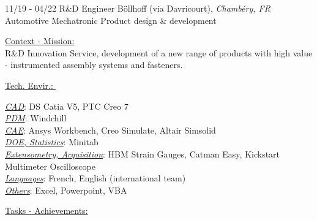 \documentclass[]{friggeri-cv}
\begin{document}
\begin{entrylist}
  \entry
    {11/19 - 04/22}
    {R\&D Engineer}
    {Böllhoff (via Davricourt), \textit{Chambéry, FR}}
    {Automotive Mechatronic Product design \& development}
\end{entrylist}
\vspace{-10pt}
\begin{minipage}[t]{0.65\linewidth}
\underline{Context - Mission: }\\
R\&D Innovation Service, development of a new range of products with high value - instrumented assembly systems and fasteners.\\
\end{minipage} %
\begin{minipage}[t]{0.38\textwidth}
    \underline{Tech. Envir.: }\
    \vspace{1mm}
    
\underline{\textit{CAD}}: DS Catia V5, PTC Creo 7\\
\underline{\textit{PDM}}: Windchill\\
\underline{\textit{CAE}}: Ansys Workbench, Creo Simulate, Altair Simsolid\\
\underline{\textit{DOE, Statistics}}: Minitab\\
\underline{\textit{Extensometry, Acquisition}}: HBM Strain Gauges, Catman Easy, Kickstart Multimeter Oscilloscope\\
\underline{\textit{Languages}}: French, English (international team)\\
\underline{\textit{Others}}: Excel, Powerpoint, VBA
    \end{minipage}
\vspace{1.5mm}
\underline{Tasks - Achievements: }\\
\end{document}
